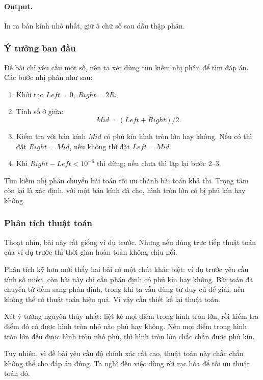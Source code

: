 \documentclass[11pt]{article}
\begin{document}
\paragraph{Output.}
In ra bán kính nhỏ nhất, giữ \(5\) chữ số sau dấu thập phân.

\subsubsection*{Ý tưởng ban đầu}

Đề bài chỉ yêu cầu một số, nên ta xét dùng tìm kiếm nhị phân để tìm đáp án.
Các bước nhị phân như sau:
\begin{enumerate}
  \item Khởi tạo \(Left=0,\ Right=2R\).
  \item Tính số ở giữa:
  \[
    Mid=(Left+Right)/2.
  \]
  \item Kiểm tra với bán kính \(Mid\) có phủ kín hình tròn lớn hay không. Nếu
  có thì đặt \(Right=Mid\), nếu không thì đặt \(Left=Mid\).
  \item Khi \(Right-Left<10^{-6}\) thì dừng; nếu chưa thì lặp lại bước 2--3.
\end{enumerate}

Tìm kiếm nhị phân chuyển bài toán tối ưu thành bài toán khả thi. Trọng tâm còn
lại là xác định, với một bán kính đã cho, hình tròn lớn có bị phủ kín hay
không.

\subsubsection*{Phân tích thuật toán}

Thoạt nhìn, bài này rất giống ví dụ trước. Nhưng nếu dùng trực tiếp thuật toán
của ví dụ trước thì thời gian hoàn toàn không chịu nổi.

Phân tích kỹ hơn mới thấy hai bài có một chút khác biệt: ví dụ trước yêu cầu
tính số miền, còn bài này chỉ cần phán định có phủ kín hay không. Bài toán đã
chuyển từ đếm sang phán định, trong khi ta vẫn dùng tư duy cũ để giải, nên
không thể có thuật toán hiệu quả. Vì vậy cần thiết kế lại thuật toán.

Xét ý tưởng nguyên thủy nhất: liệt kê mọi điểm trong hình tròn lớn, rồi kiểm
tra điểm đó có được hình tròn nhỏ nào phủ hay không. Nếu mọi điểm trong hình
tròn lớn đều được hình tròn nhỏ phủ, thì hình tròn lớn chắc chắn được phủ kín.

Tuy nhiên, vì đề bài yêu cầu độ chính xác rất cao, thuật toán này chắc chắn
không thể cho đáp án đúng. Ta nghĩ đến việc dùng rời rạc hóa để tối ưu thuật
toán đó.
\end{document}
